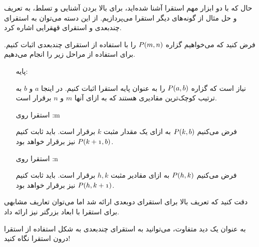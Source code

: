 حال که با دو ابزار مهم استقرا آشنا شده‌اید،
برای بالا بردن آشنایی و تسلط،‌ به تعریف و حل مثال از گونه‌های دیگر استقرا می‌پردازیم.
از این دسته می‌توان به استقرای چندبعدی و استقرای قهقرایی اشاره کرد.

\begin{DEFINITION}
    فرض کنید که می‌خواهیم  گزاره
    $\mathnormal{P(m, n)}$
    را با استفاده از استقرای چندبعدی اثبات کنیم.
    برای استفاده از
    مراحل زیر را انجام می‌دهیم.
    
    \begin{enumerate}
        \item [پایه:]
                
                نیاز است که گزاره 
                $\mathnormal{P(a, b)}$
                را به عنوان پایه استقرا اثبات کنیم.
                در اینجا
                $a$
                و
                $b$
                به ترتیب کوچک‌ترین مقادیری هستند که به ازای آنها
                $m$
                و
                $n$
                برقرار است.

        \item[استقرا روی :m]
        
                فرض می‌کنیم
                $\mathnormal{P(k, b)}$
                به ازای یک مقدار مثبت
                $k$
                برقرار است. باید ثابت کنیم
                $\mathnormal{P(k + 1, b)}$
                نیز برقرار خواهد بود.
        
        \item[استقرا روی :n]
                
                فرض می‌کنیم
                $\mathnormal{P(h, k)}$
                به ازای مقادیر مثبت
                $h, k$
                برقرار است. باید ثابت کنیم
                $\mathnormal{P(h, k + 1)}$
                نیز برقرار خواهد بود.


    \end{enumerate} 
    دقت کنید که تعریف بالا برای استقرای دوبعدی ارائه شد اما می‌توان تعاریف مشابهی برای استقرا با ابعاد
    بزرگتر نیز ارائه داد.
    
    به عنوان یک دید متفاوت، می‌توانید به استقرای چندبعدی به شکل استفاده از استقرا درون استقرا نگاه کنید!
\end{DEFINITION}

